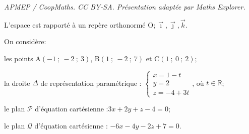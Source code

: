 \documentclass[10pt]{article}
\providecommand{\R}{\mathbb{R}}
\providecommand{\Oijk}{\(\mathrm{O};\vec{\imath},\vec{\jmath},\vec{k}\)}
\begin{document}
\noindent\textit{APMEP / CoopMaths. CC BY-SA. Présentation adaptée par Maths Explorer.}\par\medskip
\medskip






L'espace est rapporté à un repère orthonormé \Oijk.

\medskip

\begin{list}{\textbullet}{On considère:}
\item les points A$(-1~;~-2~;~3)$, B$(1~;~-2~;~7)$ et C$(1~;~0~;~2)$;
\item la droite $\Delta$ de représentation paramétrique : \quad $\left\{\begin{array}{l}x=1-t \\ y=2 \\ z=-4+3 t\end{array}\right.$, où $t \in \R$;
\item le plan $\mathcal{P}$ d'équation cartésienne :\quad $3 x+2 y+z-4=0$;
\item le plan $\mathcal{Q}$ d'équation cartésienne : \quad $-6 x-4 y-2 z+7=0$.
\end{list}
\end{document}

